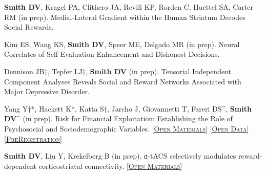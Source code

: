 \documentclass[11pt, letterpaper]{article}
\newcommand{\materials}[1]{\href{#1}{\scriptsize\textsc{[Open Materials]}}}
\newcommand{\data}[1]{\href{#1}{\scriptsize\textsc{[Open Data]}}}
\newcommand{\preregistration}[1]{\href{#1}{\scriptsize\textsc{[PreRegistration]}}}
\begin{document}
\begin{hangparas}{.5in}{1}

\textbf{Smith DV}, Kragel PA, Clithero JA, Revill KP, Rorden C, Huettel SA, Carter RM (in prep). Medial-Lateral Gradient within the Human Striatum Decodes Social Rewards.


Kim ES, Wang KS, \textbf{Smith DV}, Speer ME, Delgado MR (in prep). Neural Correlates of Self-Evaluation Enhancement and Dishonest Decisions.

Dennison JB†, Tepfer LJ†, \textbf{Smith DV} (in prep). Tensorial Independent Component Analyses Reveals Social and Reward Networks Associated with Major Depressive Disorder. 

Yang Y†*, Hackett K*, Katta S†, Jarcho J, Giovannetti T, Fareri DS\^{}, \textbf{Smith DV}\^{} (in prep). Risk for Financial Exploitation: Establishing the Role of Psychosocial and Sociodemographic Variables. \materials{https://osf.io/hd5nx/} \data{https://osf.io/hd5snx/} \preregistration{https://osf.io/hd5nx/}

\textbf{Smith DV}, Liu Y, Krekelberg B (in prep). ɑ-tACS selectively modulates reward-dependent corticostriatal connectivity. \materials{https://github.com/DVS-Lab/r21-cardgame}


\end{hangparas}


\vspace{.4cm}
\end{document}
